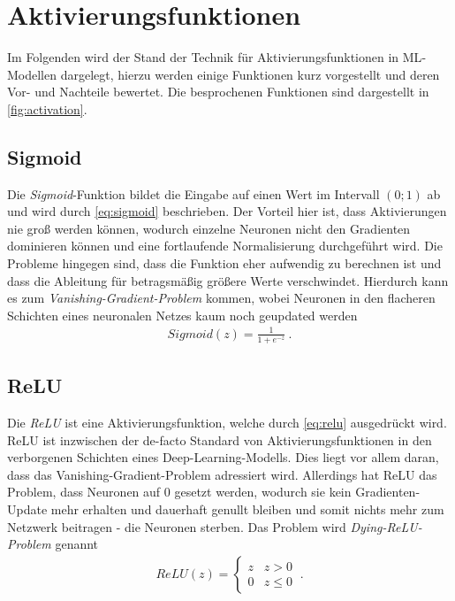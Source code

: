 \section{Aktivierungsfunktionen} \label{sec:activation}

Im Folgenden wird der Stand der Technik für Aktivierungsfunktionen in \ac{ML}-Modellen dargelegt,
hierzu werden einige Funktionen kurz vorgestellt und deren Vor- und Nachteile bewertet. 
Die besprochenen Funktionen sind dargestellt in \autoref{fig:activation}.

\subsection{Sigmoid}

Die \textit{Sigmoid}-Funktion bildet die Eingabe auf einen Wert im Intervall $(0;1)$ ab und wird durch \autoref{eq:sigmoid} beschrieben.
Der Vorteil hier ist, dass Aktivierungen nie groß werden können, wodurch einzelne Neuronen nicht den Gradienten dominieren können und 
eine fortlaufende Normalisierung durchgeführt wird. Die Probleme hingegen sind, dass die Funktion eher aufwendig zu berechnen ist 
und dass die Ableitung für betragsmäßig größere Werte verschwindet. Hierdurch kann es zum \textit{Vanishing-Gradient-Problem} kommen, wobei 
Neuronen in den flacheren Schichten eines neuronalen Netzes kaum noch geupdated werden \cite[S.~191--192]{Goodfellow.2016} 
\begin{align}
	\label{eq:sigmoid} Sigmoid(z) = \frac{1}{1+e^{-z}}~.
\end{align} 

\subsection{\acf{ReLU}}

Die \textit{\acf{ReLU}} ist eine Aktivierungsfunktion, welche durch \autoref{eq:relu} ausgedrückt wird. 
\ac{ReLU} ist inzwischen der de-facto Standard von Aktivierungsfunktionen in den verborgenen Schichten eines Deep-Learning-Modells.
Dies liegt vor allem daran, dass das Vanishing-Gradient-Problem adressiert wird. Allerdings hat \ac{ReLU} das Problem, 
dass Neuronen auf $0$ gesetzt werden, wodurch sie kein Gradienten-Update mehr erhalten und dauerhaft genullt bleiben 
und somit nichts mehr zum Netzwerk beitragen - die Neuronen sterben. Das Problem wird \textit{Dying-\ac{ReLU}-Problem} genannt \cite[S.~189--191]{Goodfellow.2016} 
\begin{align}
	\label{eq:relu} ReLU(z) = \begin{cases} 
		z & z > 0 \\
		0 & z \leq 0 
	\end{cases}~.
\end{align} 

